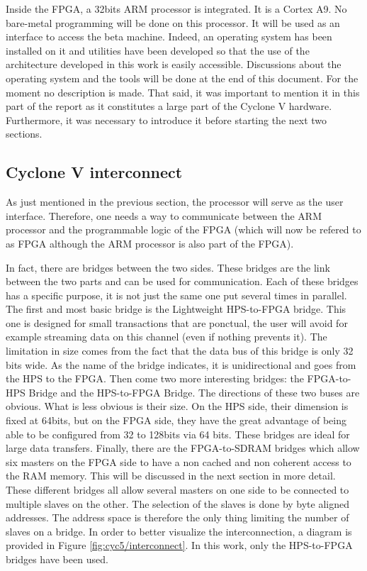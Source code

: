 Inside the FPGA, a 32bits ARM processor is integrated. It is a Cortex A9. No bare-metal programming 
will be done on this processor. It will be used as an interface to access the beta machine. Indeed, 
an operating system has been installed on it and utilities have been developed so that the use of 
the architecture developed in this work is easily accessible. Discussions about the operating system 
and the tools will be done at the end of this document. For the moment no description is made. That 
said, it was important to mention it in this part of the report as it constitutes a large part of 
the Cyclone V hardware. Furthermore, it was necessary to introduce it before starting the next two 
sections.

\subsection{Cyclone V interconnect}

As just mentioned in the previous section, the processor will serve as the user interface. 
Therefore, one needs a way to communicate between the ARM processor and the programmable logic of the 
FPGA (which will now be refered to as FPGA although the ARM processor is also part of the FPGA). 

In fact, there are bridges between the two sides. These bridges are the link between the two parts 
and can be used for communication. Each of these bridges has a specific purpose, it is not just the 
same one put several times in parallel. The first and most basic bridge is the Lightweight HPS-to-FPGA 
bridge. This one is designed for small transactions that are ponctual, the user will avoid for example 
streaming data on this channel (even if nothing prevents it). The limitation in size comes from the 
fact that the data bus of this bridge is only 32 bits wide. As the name of the bridge indicates, it 
is unidirectional and goes from the HPS to the FPGA. Then come two more interesting bridges: the 
FPGA-to-HPS Bridge and the HPS-to-FPGA Bridge. The directions of these two buses are obvious. What 
is less obvious is their size. On the HPS side, their dimension is fixed at 64bits, but on the FPGA 
side, they have the great advantage of being able to be configured from 32 to 128bits via 64 bits. 
These bridges are ideal for large data transfers. Finally, there are the FPGA-to-SDRAM bridges which 
allow six masters on the FPGA side to have a non cached and non coherent access to the RAM memory. 
This will be discussed in the next section in more detail. These different bridges all allow several
masters on one side to be connected to multiple slaves on the other. The selection of the 
slaves is done by byte aligned addresses. The address space is therefore the only thing limiting the 
number of slaves on a bridge. In order to better visualize the interconnection, a diagram is provided 
in Figure \ref{fig:cyc5/interconnect}. In this work, only the HPS-to-FPGA bridges have been used. 

